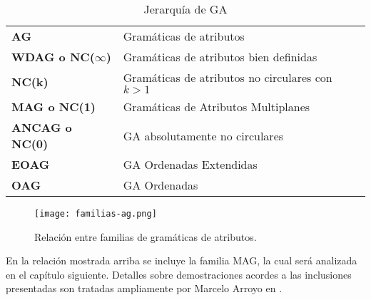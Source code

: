 \begin{table}[!ht]\centering
\begin{tabular}{ll}
\textbf{AG}         & Gramáticas de atributos \\
\textbf{WDAG o NC($\infty$)}       & Gramáticas de atributos bien definidas\\
\textbf{NC(k)}       & Gramáticas de atributos no circulares con $k > 1$\\
\textbf{MAG o NC(1)}       & Gramáticas de Atributos Multiplanes\\
\textbf{ANCAG o NC(0)}      & GA absolutamente no circulares \\
\textbf{EOAG}       & GA Ordenadas Extendidas \\
\textbf{OAG}        & GA Ordenadas \\
\end{tabular}
\caption{Jerarquía de GA}
\label{jer-GA}
\end{table}

\begin{figure}\centering
\texttt{[image: familias-ag.png]}
\caption{\label{jer-GA2}Relación entre familias de gramáticas de atributos.} 
\end{figure}

En la relación mostrada arriba se incluye la familia MAG, la cual será analizada en el capítulo siguiente.
Detalles sobre demostraciones acordes a las inclusiones presentadas son tratadas ampliamente por Marcelo Arroyo en \cite{tesismarcelo}.